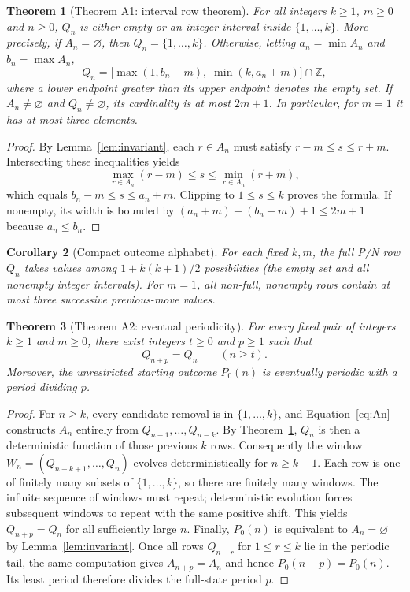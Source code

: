\documentclass[11pt]{article}
\newtheorem{theorem}{Theorem}[section]
\newtheorem{corollary}[theorem]{Corollary}
\newcommand{\K}{\{1,\ldots,k\}}
\begin{document}
\begin{theorem}[Theorem A1: interval row theorem]\label{thm:interval}
For all integers $k\ge1$, $m\ge0$ and $n\ge0$, $Q_n$ is either empty or an
integer interval inside $\K$.  More precisely, if $A_n=\varnothing$, then
$Q_n=\K$.  Otherwise, letting $a_n=\min A_n$ and $b_n=\max A_n$,
\begin{equation}\label{eq:interval}
\boxed{
Q_n=\bigl[\max(1,b_n-m),\;\min(k,a_n+m)\bigr]\cap\mathbb Z,
}
\end{equation}
where a lower endpoint greater than its upper endpoint denotes the empty
set.  If $A_n\ne\varnothing$ and $Q_n\ne\varnothing$, its cardinality is
at most $2m+1$.  In particular, for $m=1$ it has at most three elements.
\end{theorem}
\begin{proof}
By Lemma~\ref{lem:invariant}, each $r\in A_n$ must satisfy
$r-m\le s\le r+m$.  Intersecting these inequalities yields
\[
\max_{r\in A_n}(r-m)\le s\le\min_{r\in A_n}(r+m),
\]
which equals $b_n-m\le s\le a_n+m$.  Clipping to
$1\le s\le k$ proves the formula.  If nonempty, its width is bounded by
$(a_n+m)-(b_n-m)+1\le2m+1$ because $a_n\le b_n$.
\end{proof}

\begin{corollary}[Compact outcome alphabet]\label{cor:alphabet}
For each fixed $k,m$, the full P/N row $Q_n$ takes values among
$1+k(k+1)/2$ possibilities (the empty set and all nonempty integer
intervals).  For $m=1$, all non-full, nonempty rows contain at most
three successive previous-move values.
\end{corollary}

\begin{theorem}[Theorem A2: eventual periodicity]\label{thm:eventual}
For every fixed pair of integers $k\ge1$ and $m\ge0$, there exist
integers $t\ge0$ and $p\ge1$ such that
\[
\boxed{Q_{n+p}=Q_n\qquad(n\ge t).}
\]
Moreover, the unrestricted starting outcome $P_0(n)$ is eventually periodic
with a period dividing $p$.
\end{theorem}
\begin{proof}
For $n\ge k$, every candidate removal is in $\K$, and
Equation~\eqref{eq:An} constructs $A_n$ entirely from
$Q_{n-1},\ldots,Q_{n-k}$.  By Theorem~\ref{thm:interval},
$Q_n$ is then a deterministic function of those previous $k$ rows.
Consequently the window
$W_n=(Q_{n-k+1},\ldots,Q_n)$ evolves deterministically for $n\ge k-1$.
Each row is one of finitely many subsets of $\K$, so there are finitely
many windows.  The infinite sequence of windows must repeat; deterministic
evolution forces subsequent windows to repeat with the same positive shift.
This yields $Q_{n+p}=Q_n$ for all sufficiently large $n$.
Finally, $P_0(n)$ is equivalent to $A_n=\varnothing$ by
Lemma~\ref{lem:invariant}.  Once all rows $Q_{n-r}$ for $1\le r\le k$
lie in the periodic tail, the same computation gives
$A_{n+p}=A_n$ and hence $P_0(n+p)=P_0(n)$.
Its least period therefore divides the full-state period $p$.
\end{proof}
\end{document}
